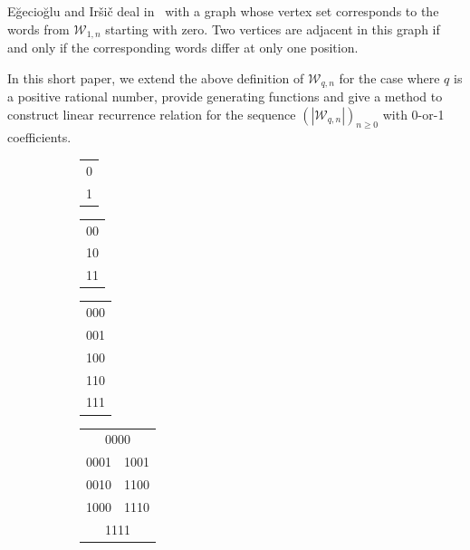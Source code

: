 \documentclass[a4paper,12pt]{article}
\theoremstyle{definition}
\newcommand{\W}{\mathcal{W}}
\let\ge\geqslant
\begin{document}
Eğecioğlu and Iršič deal in~\cite{EI} with a graph whose vertex set
corresponds to the words from $\W_{1,n}$ starting with zero. Two
vertices are adjacent in this graph if and only if the corresponding
words differ at only one position.

In this short paper, we extend the above definition of $\W_{q,n}$ for
the case where $q$ is a positive rational number, provide generating
functions and give a method to construct linear recurrence relation
for the sequence $(|\W_{q,n}|)_{n\ge 0}$ with 0-or-1 coefficients.

\begin{figure}[ht]
  \centering
  \begin{subfigure}[b]{0.43\textwidth}
      \begin{tabular}{c}
        0 \\
        1
      \end{tabular}
      \begin{tabular}{c}
        00 \\
        10 \\
        11
      \end{tabular}
      \begin{tabular}{c}
        000 \\
        001 \\
        100 \\
        110 \\
        111 
      \end{tabular}
      {\setlength{\tabcolsep}{5pt}
      \begin{tabular}{cc}
        \multicolumn{2}{c}{0000} \\
        0001 & 1001 \\
        0010 & 1100 \\
        1000 & 1110 \\
        \multicolumn{2}{c}{1111} \\
      \end{tabular}
      }
      \vspace*{2em}

\end{subfigure}
\end{figure}
\end{document}
